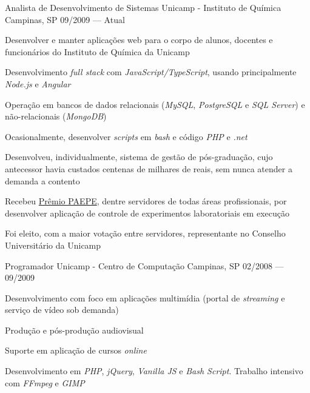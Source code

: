 

\begin{cventries}

  \cventry
    {Analista de Desenvolvimento de Sistemas} %
    {Unicamp - Instituto de Química} %
    {Campinas, SP} %
    {09/2009 — Atual} %
    {
      \begin{cvitems} %
        \item {Desenvolver e manter aplicações web para o corpo de alunos, docentes e funcionários do Instituto de Química da Unicamp}
        \item {Desenvolvimento \textit{full stack} com \textit{JavaScript/TypeScript}, usando principalmente \textit{Node.js} e \textit{Angular}}
        \item {Operação em bancos de dados relacionais (\textit{MySQL}, \textit{PostgreSQL} e \textit{SQL Server}) e não-relacionais (\textit{MongoDB})}
        \item {Ocasionalmente, desenvolver \textit{scripts} em \textit{bash} e código \textit{PHP} e \textit{.net}}
        \item {Desenvolveu, individualmente, sistema de gestão de pós-graduação, cujo antecessor havia custados centenas de milhares de reais, sem nunca atender a demanda a contento}
        \item {Recebeu \href{https://www.dgrh.unicamp.br/premiopaepe}{Prêmio PAEPE}, dentre servidores de todas áreas profissionais, por desenvolver aplicação de controle de experimentos laboratoriais em execução}
        \item {Foi eleito, com a maior votação entre servidores, representante no Conselho Universitário da Unicamp}
      \end{cvitems}
    }

  \cventry
    {Programador} %
    {Unicamp - Centro de Computação} %
    {Campinas, SP} %
    {02/2008 — 09/2009} %
    {
      \begin{cvitems} %
        \item {Desenvolvimento com foco em aplicações multimídia (portal de \textit{streaming} e serviço de vídeo sob demanda)}
        \item {Produção e pós-produção audiovisual}
        \item {Suporte em aplicação de cursos \textit{online}}
        \item {Desenvolvimento em \textit{PHP}, \textit{jQuery}, \textit{Vanilla JS} e \textit{Bash Script}. Trabalho intensivo com \textit{FFmpeg} e \textit{GIMP}}
      \end{cvitems}
    }

\end{cventries}
